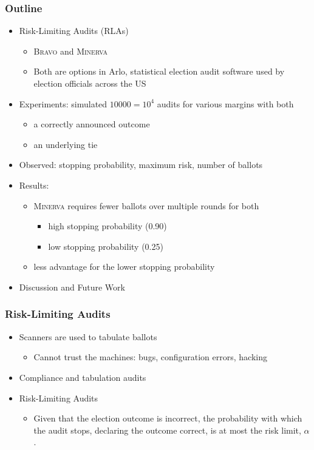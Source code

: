 \documentclass[aspectratio=169]{beamer}
\newcommand{\Minerva}{\textsc{Minerva}\xspace}
\newcommand{\BRAVO}{\textsc{Bravo}\xspace}
\begin{document}
\begin{frame}
\frametitle{Outline}

\begin{itemize}
\item Risk-Limiting Audits (RLAs)
\begin{itemize}
\item \BRAVO and \Minerva
\pause
\item Both are options in Arlo, statistical election audit software used by election officials across the US
\end{itemize}
\pause 
\item Experiments: simulated $10000=10^4$ audits for various margins with both
\begin{itemize}
\item a correctly announced outcome 
\item an underlying tie
\end{itemize}
\pause 
\item Observed: stopping probability, maximum risk, number of ballots
\pause 
\item Results:
\begin{itemize}
\item \Minerva requires fewer ballots over multiple rounds for both 
\begin{itemize}
\item high stopping probability (0.90)
\item low stopping probability (0.25)
\end{itemize}
\item less advantage for the lower stopping probability
\end{itemize}
\pause 
\item Discussion and Future Work
\end{itemize}

\end{frame}


\begin{frame}
\frametitle{Risk-Limiting Audits}

\begin{itemize}
\item Scanners are used to tabulate ballots
\pause 
\begin{itemize}
\item Cannot trust the machines: bugs, configuration errors, hacking
\pause 
\end{itemize}
\item Compliance and tabulation audits
\pause 
\item Risk-Limiting Audits
\begin{itemize}
\item
Given that the election outcome is incorrect,
the probability with which the audit stops, declaring the outcome correct, is at most the risk limit, $\alpha$.
\end{itemize}
\end{itemize}
\end{frame}
\end{document}
